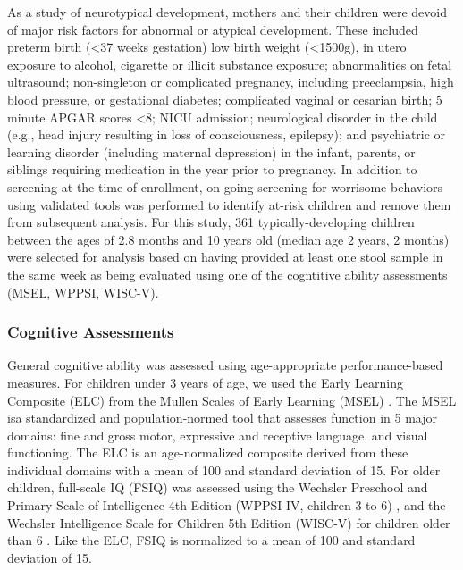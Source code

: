 \documentclass{article}
\begin{document}
As a study of neurotypical development, mothers and their children
were devoid of major risk factors for abnormal or atypical development.
These included preterm birth (\textless 37 weeks gestation) low birth weight (\textless 1500g),
in utero exposure to alcohol, cigarette or illicit substance exposure;
abnormalities on fetal ultrasound; non-singleton or complicated pregnancy,
including preeclampsia, high blood pressure, or gestational diabetes;
complicated vaginal or cesarian birth; 5 minute APGAR scores \textless 8;
NICU admission; neurological disorder in the child
(e.g., head injury resulting in loss of consciousness, epilepsy);
and psychiatric or learning disorder (including maternal depression)
in the infant, parents, or siblings requiring medication in the year prior to pregnancy.
In addition to screening at
the time of enrollment, on-going screening for worrisome behaviors using
validated tools was performed to identify at-risk children and remove
them from subsequent analysis.
For this study, 361 typically-developing children between the
ages of 2.8 months and 10 years old (median age 2 years, 2 months) were
selected for analysis based on having provided at least one stool sample
in the same week as being evaluated using one of the cogntitive ability
assessments (MSEL, WPPSI, WISC-V).

\subsubsection*{Cognitive Assessments}

General cognitive ability was assessed using age-appropriate performance-based measures.
For children under 3 years of age, we used the Early Learning
Composite (ELC) from the Mullen Scales of Early Learning (MSEL)
\cite{mullenMullenScalesEarly1995}.
The MSEL isa standardized and population-normed tool that assesses 
function in 5 major domains: fine and gross motor, expressive and receptive language,  
and visual functioning.
The ELC is an age-normalized composite derived from these individual domains
with a mean of 100 and standard deviation of 15. For older children, full-scale IQ (FSIQ)
was assessed using the Wechsler Preschool and Primary Scale of Intelligence 4th Edition
(WPPSI-IV, children 3 to 6) \cite{wechslerWechslerPreschoolPrimary2012},
and the Wechsler Intelligence Scale for Children 5th Edition (WISC-V)
for children older than 6 \cite{wechslerWechslerIntelligenceScale1949}. 
Like the ELC, FSIQ is normalized to a mean of 100 and standard deviation of 15.
\end{document}
